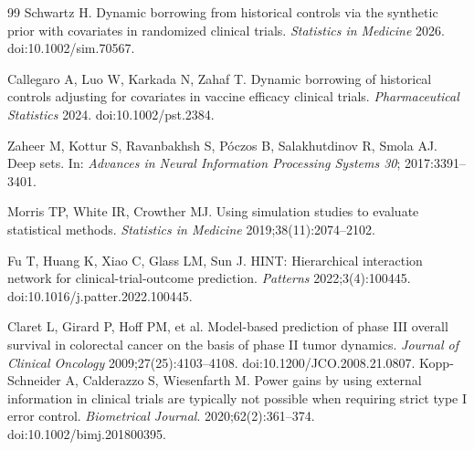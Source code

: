 \documentclass[11pt]{article}
\begin{document}
\begin{thebibliography}{99}
 Schwartz H. Dynamic borrowing from historical controls via the
synthetic prior with covariates in randomized clinical trials.
\emph{Statistics in Medicine} 2026. doi:10.1002/sim.70567.

 Callegaro A, Luo W, Karkada N, Zahaf T. Dynamic borrowing of
historical controls adjusting for covariates in vaccine efficacy clinical
trials. \emph{Pharmaceutical Statistics} 2024. doi:10.1002/pst.2384.

 Zaheer M, Kottur S, Ravanbakhsh S, P\'oczos B, Salakhutdinov R,
Smola AJ. Deep sets. In: \emph{Advances in Neural Information Processing
Systems 30}; 2017:3391--3401.

 Morris TP, White IR, Crowther MJ. Using simulation studies to
evaluate statistical methods. \emph{Statistics in Medicine}
2019;38(11):2074--2102.

 Fu T, Huang K, Xiao C, Glass LM, Sun J. HINT: Hierarchical
interaction network for clinical-trial-outcome prediction. \emph{Patterns}
2022;3(4):100445. doi:10.1016/j.patter.2022.100445.

 Claret L, Girard P, Hoff PM, et al. Model-based prediction of
phase III overall survival in colorectal cancer on the basis of phase II tumor
dynamics. \emph{Journal of Clinical Oncology} 2009;27(25):4103--4108.
doi:10.1200/JCO.2008.21.0807.
 Kopp-Schneider A, Calderazzo S, Wiesenfarth M. Power gains by
using external information in clinical trials are typically not possible when
requiring strict type I error control. \emph{Biometrical Journal}.
2020;62(2):361--374. doi:10.1002/bimj.201800395.
\end{thebibliography}

\appendix
\end{document}
